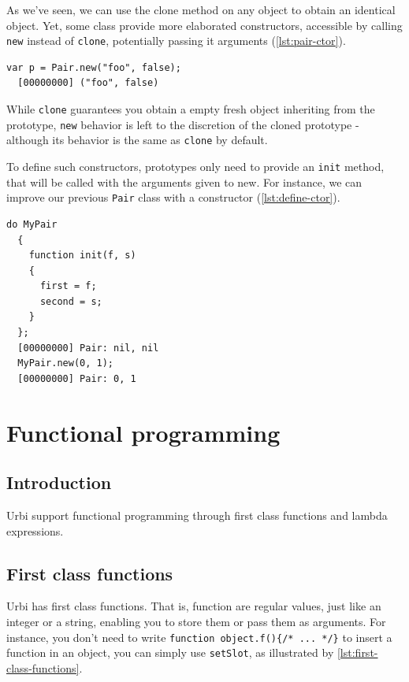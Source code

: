 \documentclass[openright,twoside,12pt]{report}
\newcommand{\urbi}{Urbi\xspace}
\newcommand{\lst}[1]{\autoref{lst:#1}}
\begin{document}
As we've seen, we can use the clone method on any object to obtain an
identical object. Yet, some class provide more elaborated
constructors, accessible by calling \texttt{new} instead of
\texttt{clone}, potentially passing it arguments (\lst{pair-ctor}).

\begin{lstlisting}[caption=Calling constructors with \texttt{new},
  label=lst:pair-ctor]
  var p = Pair.new("foo", false);
  [00000000] ("foo", false)
\end{lstlisting}

While \texttt{clone} guarantees you obtain a empty fresh object
inheriting from the prototype, \texttt{new} behavior is left to the
discretion of the cloned prototype - although its behavior is the same
as \texttt{clone} by default.

To define such constructors, prototypes only need to provide an
\texttt{init} method, that will be called with the arguments given to
new. For instance, we can improve our previous \texttt{Pair} class
with a constructor (\lst{define-ctor}).

\begin{lstlisting}[caption=Defining constructors, label=lst:define-ctor]
  do MyPair
  {
    function init(f, s)
    {
      first = f;
      second = s;
    }
  };
  [00000000] Pair: nil, nil
  MyPair.new(0, 1);
  [00000000] Pair: 0, 1
\end{lstlisting}


\chapter{Functional programming}
\label{section:functional}

\section{Introduction}

\urbi support functional programming through first class functions and
lambda expressions.

\section{First class functions}

\urbi has first class functions. That is, function are regular values,
just like an integer or a string, enabling you to store them or pass
them as arguments. For instance, you don't need to write
\lstinline|function object.f(){/* ... */}| to insert a function in an
object, you can simply use \texttt{setSlot}, as illustrated by
\lst{first-class-functions}.
\end{document}
